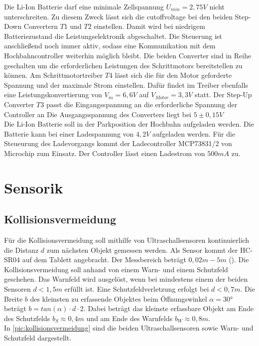 Die Li-Ion Batterie darf eine minimale Zellspannung $U_{min} =2,75V$ nicht unterschreiten. Zu diesem Zweck lässt sich die \acrshort{cutoffvoltage} bei den beiden Step-Down Convertern $T1$ und $T2$ einstellen. Damit wird bei  niedrigem Batteriezustand die Leistungselektronik abgeschaltet. Die Steuerung ist anschließend noch immer aktiv, sodass eine Kommunikation mit dem Hochbahncontroller weiterhin möglich bleibt. Die beiden Converter sind in Reihe geschalten um die erforderlichen Leistungen des Schrittmotors bereitstellen zu können. Am Schrittmotortreiber $T4$ lässt sich die für den Motor geforderte Spannung und der maximale Strom einstellen. Dafür findet im Treiber ebenfalls eine Leistungskonvertierung von $V_{in}=6,6V$ auf $V_{Motor}=3,3V$ statt. Der Step-Up Converter $T3$ passt die Eingangsspannung an die erforderliche Spannung der Controller an Die Ausgangsspannung des Converters liegt bei $5 \pm 0,15 V$ \\

Die Li-Ion Batterie soll in der Parkposition der Hochbahn aufgeladen werden. Die Batterie kann bei einer Ladespannung von $4,2V$ aufgeladen werden. Für die Steueurung des Ladevorgangs kommt der Ladecontroller MCP73831/2 von Microchip zum Einsatz. Der Controller lässt einen Ladestrom von 	$500mA$ zu. 


\newpage

\section{Sensorik}
\subsection{Kollisionsvermeidung}
Für die Kollisionsvermeidung soll mithilfe von Ultraschallsensoren kontinuierlich die Distanz $d$ zum nächsten Objekt gemessen werden. Als Sensor kommt der HC-SR04 auf dem Tablett angebracht. Der Messbereich beträgt $0,02m - 5m$ (\cite{hcrs04}). Die Kollisionsvermeidung soll anhand von einem Warn- und einem Schutzfeld geschehen. Das Warnfeld wird ausgelöst, wenn bei mindestens einem der beiden Sensoren $d<1,5m$ erfüllt ist. Eine Schutzfeldverletzung erfolgt bei $d<0,7m$. Die Breite $b$ des kleinsten zu erfassende Objektes beim Öffnungswinkel $\alpha = 30°$ beträgt $b= tan(\alpha) \cdot d \cdot 2$. Dabei beträgt das kleinste erfassbare Objekt am Ende des Schutzfelds $b_S \approx 0,4m$ und am Ende des Warnfelds $b_W \approx 0,8m$. \\
In \autoref{pic:kollisionsvermeidung} sind die beiden Ultraschallsensoren sowie Warn- und Schutzfeld dargestellt. 

